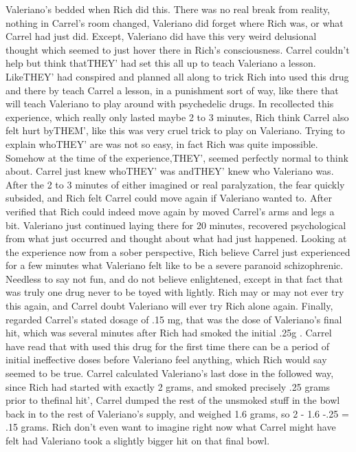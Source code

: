 \documentclass[12pt]{book}
\begin{document}
Valeriano's bedded when Rich did this. There was no real break from reality, nothing in Carrel's room changed, Valeriano did forget where Rich was, or what Carrel had just did. Except, Valeriano did have this very weird delusional thought which seemed to just hover there in Rich's consciousness. Carrel couldn't help but think thatTHEY' had set this all up to teach Valeriano a lesson. LikeTHEY' had conspired and planned all along to trick Rich into used this drug and there by teach Carrel a lesson, in a punishment sort of way, like there that will teach Valeriano to play around with psychedelic drugs. In recollected this experience, which really only lasted maybe 2 to 3 minutes, Rich think Carrel also felt hurt byTHEM', like this was very cruel trick to play on Valeriano. Trying to explain whoTHEY' are was not so easy, in fact Rich was quite impossible. Somehow at the time of the experience,THEY', seemed perfectly normal to think about. Carrel just knew whoTHEY' was andTHEY' knew who Valeriano was. After the 2 to 3 minutes of either imagined or real paralyzation, the fear quickly subsided, and Rich felt Carrel could move again if Valeriano wanted to. After verified that Rich could indeed move again by moved Carrel's arms and legs a bit. Valeriano just continued laying there for 20 minutes, recovered psychological from what just occurred and thought about what had just happened. Looking at the experience now from a sober perspective, Rich believe Carrel just experienced for a few minutes what Valeriano felt like to be a severe paranoid schizophrenic. Needless to say not fun, and do not believe enlightened, except in that fact that was truly one drug never to be toyed with lightly. Rich may or may not ever try this again, and Carrel doubt Valeriano will ever try Rich alone again. Finally, regarded Carrel's stated dosage of .15 mg, that was the dose of Valeriano's final hit, which was several minutes after Rich had smoked the initial .25g . Carrel have read that with used this drug for the first time there can be a period of initial ineffective doses before Valeriano feel anything, which Rich would say seemed to be true. Carrel calculated Valeriano's last dose in the followed way, since Rich had started with exactly 2 grams, and smoked precisely .25 grams prior to thefinal hit', Carrel dumped the rest of the unsmoked stuff in the bowl back in to the rest of Valeriano's supply, and weighed 1.6 grams, so 2 - 1.6 -.25 = .15 grams. Rich don't even want to imagine right now what Carrel might have felt had Valeriano took a slightly bigger hit on that final bowl.
\end{document}
